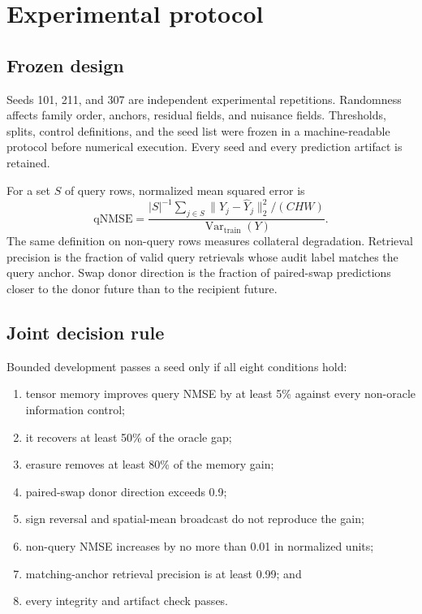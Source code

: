\documentclass[11pt]{article}
\newcommand{\qnmse}{\mathrm{qNMSE}}
\begin{document}
\section{Experimental protocol}

\subsection{Frozen design}

Seeds 101, 211, and 307 are independent experimental repetitions. Randomness
affects family order, anchors, residual fields, and nuisance fields. Thresholds,
splits, control definitions, and the seed list were frozen in a machine-readable
protocol before numerical execution. Every seed and every prediction artifact
is retained.

For a set $S$ of query rows, normalized mean squared error is
\begin{equation}
 \qnmse=\frac{|S|^{-1}\sum_{j\in S}\|Y_j-\widehat{Y}_j\|_2^2/(CHW)}
 {\operatorname{Var}_{\mathrm{train}}(Y)}.
\end{equation}
The same definition on non-query rows measures collateral degradation.
Retrieval precision is the fraction of valid query retrievals whose audit label
matches the query anchor. Swap donor direction is the fraction of paired-swap
predictions closer to the donor future than to the recipient future.

\subsection{Joint decision rule}

Bounded development passes a seed only if all eight conditions hold:

\begin{enumerate}[leftmargin=*]
  \item tensor memory improves query NMSE by at least 5\% against every
  non-oracle information control;
  \item it recovers at least 50\% of the oracle gap;
  \item erasure removes at least 80\% of the memory gain;
  \item paired-swap donor direction exceeds 0.9;
  \item sign reversal and spatial-mean broadcast do not reproduce the gain;
  \item non-query NMSE increases by no more than 0.01 in normalized units;
  \item matching-anchor retrieval precision is at least 0.99; and
  \item every integrity and artifact check passes.
\end{enumerate}
\end{document}
